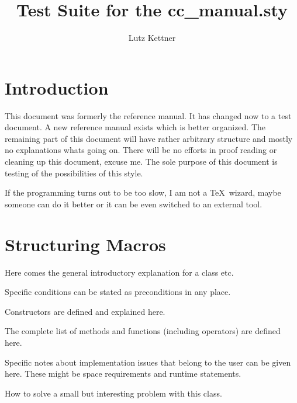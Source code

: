 \documentclass[12pt]{article}
\title {Test Suite for the cc\_manual.sty\\
        \vspace{5mm}
        \ccRevision}
\author{Lutz Kettner}
\date{\ccDate}
\begin{document}
\maketitle

\section{Introduction}

This document was formerly the reference manual. It has changed now to
a test document. A new reference manual exists which is better
organized.  The remaining part of this document will have rather
arbitrary structure and mostly no explanations whats going on. There
will be no efforts in proof reading or cleaning up this document,
excuse me. The sole purpose of this document is testing of the
possibilities of this style.

If the programming turns out to be too slow, I am not a \TeX\ wizard,
maybe someone can do it better or it can be even switched to an
external tool.

\section{Structuring Macros}

\ccDefinition Here comes the general introductory explanation for a
class etc.

\ccPrecond Specific conditions can be stated as preconditions in any place.

\ccCreation Constructors are defined and explained here.

\ccOperations The complete list of methods and functions (including
operators) are defined here.

\ccImplementation Specific notes about implementation issues that belong
to the user can be given here. These might be space requirements and
runtime statements.

\ccExample How to solve a small but interesting problem with this class.
\end{document}
